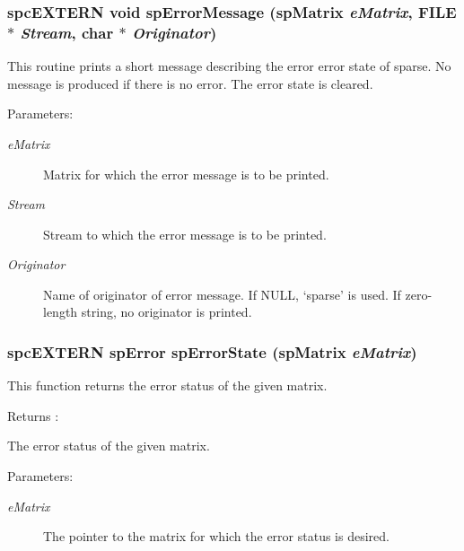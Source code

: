 \subsubsection{\setlength{\rightskip}{0pt plus 5cm}spc\-EXTERN void sp\-Error\-Message ({\bf sp\-Matrix} {\em e\-Matrix}, FILE $\ast$ {\em Stream}, char $\ast$ {\em Originator})}\label{spMatrix_8h_a29}


This routine prints a short message describing the error error state of sparse. No message is produced if there is no error. The error state is cleared.\begin{Desc}
\item[Parameters: ]\par
\begin{description}
\item[{\em 
e\-Matrix}]Matrix for which the error message is to be printed. \item[{\em 
Stream}]Stream to which the error message is to be printed. \item[{\em 
Originator}]Name of originator of error message. If NULL, `sparse' is used. If zero-length string, no originator is printed. \end{description}
\end{Desc}
\subsubsection{\setlength{\rightskip}{0pt plus 5cm}spc\-EXTERN {\bf sp\-Error} sp\-Error\-State ({\bf sp\-Matrix} {\em e\-Matrix})}\label{spMatrix_8h_a28}


This function returns the error status of the given matrix.

\begin{Desc}
\item[Returns :]\par
 The error status of the given matrix.\end{Desc}
\begin{Desc}
\item[Parameters: ]\par
\begin{description}
\item[{\em 
e\-Matrix}]The pointer to the matrix for which the error status is desired. \end{description}
\end{Desc}
